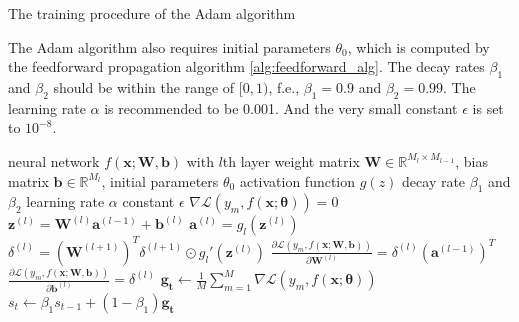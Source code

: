 \documentclass[
	parskip, 			   %
	twoside, 			   %
	DIV=14, 			   %
	BCOR=15.0mm, 		   %
	headsepline, 		   %
	open=right, 		   %
	captions=tableheading, %
	bibliography=totoc,    %
	numbers=noenddot       %
]{scrreprt}
\begin{document}
\clearpage
\begin{algorithm}[h!]
\caption{The training procedure of the Adam algorithm}
The Adam algorithm also requires initial parameters $\theta_{0}$, which is computed by the feedforward propagation algorithm \ref{alg:feedforward_alg}. The decay rates $\beta_1$ and $\beta_2$ should be within the range of $[0,1)$, f.e., $\beta_1=0.9$ and $\beta_2=0.99$. The learning rate $\alpha$ is recommended to be 0.001. And the very small constant $\epsilon$ is set to $10^{-8}$.
\label{alg:Adam_alg}
    \begin{algorithmic}
    \Require neural network $f(\mathbf{x};\mathbf{W},\mathbf{b})$ with $l$th layer
    \Require weight matrix $\mathbf{W} \in \mathbb{R}^{M_{l} \times M_{l-1}}$, bias matrix $\mathbf{b} \in \mathbb{R}^{M_{l}}$, initial parameters $\theta_{0}$
    \Require activation function $g(z)$
    \Require decay rate $\beta_1$ and $\beta_2$
    \Require learning rate $\alpha$
    \Require constant $\epsilon$
    \Ensure $\nabla \mathcal{L}\left( y_{m},f(\mathbf{x};\mathbf{\theta}) \right) = 0$
            \State $\mathbf{z}^{(l)} = \mathbf{W}^{(l)} \mathbf{a}^{(l-1)} + \mathbf{b}^{(l)}$ 
            \State $\mathbf{a}^{(l)} = g_{l}(\mathbf{z}^{(l)})$ 
            \State {}
            \State $\delta^{(l)} = (\mathbf{W}^{(l+1)})^T \delta^{(l+1)} \odot g_{l}'(\mathbf{z}^{(l)})$ 
            \State {}
            \State $\frac{\partial \mathcal{L}\left( y_m,f(\mathbf{x};\mathbf{\mathbf{W},\mathbf{b}}) \right)}{\partial \mathbf{W}^{(l)}} = \delta^{(l)} (\mathbf{a}^{(l-1)})^T$ 
            \State $\frac{\partial \mathcal{L}\left( y_m,f(\mathbf{x};\mathbf{\mathbf{W},\mathbf{b}}) \right)}{\partial \mathbf{b}^{(l)}} = \delta^{(l)}$ 
            \State {}
        \EndFor
    \EndFor
    \State $\mathbf{g_t} \gets \frac{1}{M} \sum\nolimits_{m=1}^M \nabla \mathcal{L}\left( y_{m},f(\mathbf{x};\mathbf{\theta}) \right)$ 
    \State $s_t \gets \beta_1 s_{t-1} + (1-\beta_1) \mathbf{g_t}$ 

\end{algorithmic}
\end{algorithm}
\end{document}
